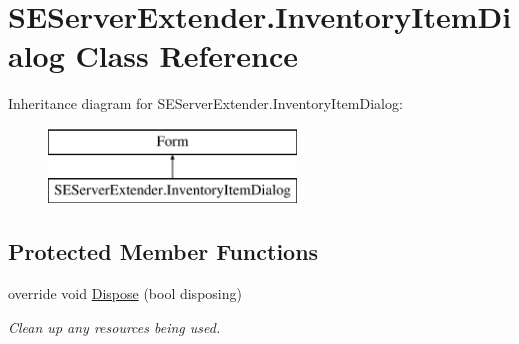 \hypertarget{class_s_e_server_extender_1_1_inventory_item_dialog}{}\section{S\+E\+Server\+Extender.\+Inventory\+Item\+Dialog Class Reference}
\label{class_s_e_server_extender_1_1_inventory_item_dialog}
Inheritance diagram for S\+E\+Server\+Extender.\+Inventory\+Item\+Dialog\+:\begin{figure}[H]
\begin{center}
\leavevmode
\includegraphics[height=2.000000cm]{class_s_e_server_extender_1_1_inventory_item_dialog}
\end{center}
\end{figure}
\subsection*{Protected Member Functions}
\begin{DoxyCompactItemize}
\item 
override void \hyperlink{class_s_e_server_extender_1_1_inventory_item_dialog_a1bec83896f41b5327ee09973ada913ab}{Dispose} (bool disposing)
\begin{DoxyCompactList}\small\item\em Clean up any resources being used. \end{DoxyCompactList}\end{DoxyCompactItemize}
